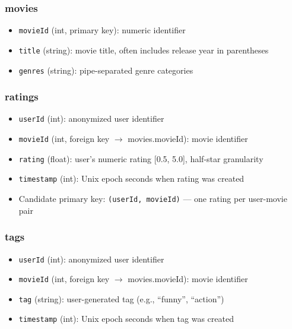\documentclass[11pt]{article}
\begin{document}
\subsubsection*{movies}

\begin{itemize}[leftmargin=1.5em]
    \item \texttt{movieId} (int, primary key): numeric identifier
    \item \texttt{title} (string): movie title, often includes release year in parentheses
    \item \texttt{genres} (string): pipe-separated genre categories
\end{itemize}

\subsubsection*{ratings}

\begin{itemize}[leftmargin=1.5em]
    \item \texttt{userId} (int): anonymized user identifier
    \item \texttt{movieId} (int, foreign key $\rightarrow$ movies.movieId): movie identifier
    \item \texttt{rating} (float): user's numeric rating [0.5, 5.0], half-star granularity
    \item \texttt{timestamp} (int): Unix epoch seconds when rating was created
    \item Candidate primary key: \texttt{(userId, movieId)} --- one rating per user-movie pair
\end{itemize}

\subsubsection*{tags}

\begin{itemize}[leftmargin=1.5em]
    \item \texttt{userId} (int): anonymized user identifier
    \item \texttt{movieId} (int, foreign key $\rightarrow$ movies.movieId): movie identifier
    \item \texttt{tag} (string): user-generated tag (e.g., ``funny'', ``action'')
    \item \texttt{timestamp} (int): Unix epoch seconds when tag was created
\end{itemize}
\end{document}
